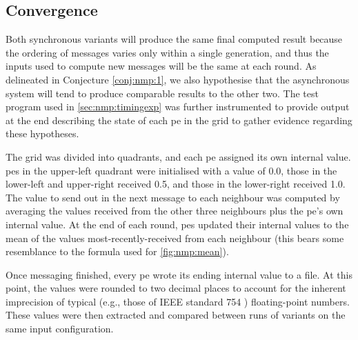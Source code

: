 \subsection{\label{sec:nmp:convergence}Convergence}
Both synchronous variants will produce the same final computed result because the ordering of messages varies only within a single generation, and thus the inputs used to compute new messages will be the same at each round.  As delineated in Conjecture \ref{conj:nmp:1}, we also hypothesise that the asynchronous system will tend to produce comparable results to the other two.  The test program used in \autoref{sec:nmp:timingexp} was further instrumented to provide output at the end describing the state of each \gls{pe} in the grid to gather evidence regarding these hypotheses.

The grid was divided into quadrants, and each \gls{pe} assigned its own internal value.  \Glspl{pe} in the upper-left quadrant were initialised with a value of 0.0, those in the lower-left and upper-right received 0.5, and those in the lower-right received 1.0.  The value to send out in the next message to each neighbour was computed by averaging the values received from the other three neighbours plus the \gls{pe}'s own internal value.  At the end of each round, \glspl{pe} updated their internal values to the mean of the values most-recently-received from each neighbour (this bears some resemblance to the formula used for \autoref{fig:nmp:mean}).  %

Once messaging finished, every \gls{pe} wrote its ending internal value to a file.  At this point, the values were rounded to two decimal places to account for the inherent imprecision of typical (e.g., those of IEEE standard 754 \cite{ieee754,Goldberg1991}) floating-point numbers.  These values were then extracted and compared between runs of variants on the same input configuration.

